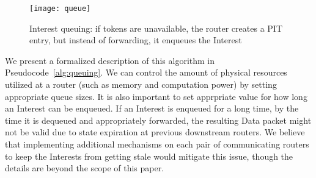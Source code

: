\begin{figure}[htbp]
  \centering
  \texttt{[image: queue]}
  \caption{Interest queuing: if tokens are unavailable, the router creates a PIT entry, but instead of forwarding, it enqueues the Interest}
  \label{fig:queueing}
\end{figure}

We present a formalized description of this algorithm in Pseudocode~\ref{alg:queuing}. We can control the amount of physical resources utilized at a router (such as memory and computation power) by setting appropriate queue sizes. It is also important to set apprpriate value for how long an Interest can be enqueued. If an Interest is enqueued for a long time, by the time it is dequeued and appropriately forwarded, the resulting Data packet might not be valid due to state expiration at previous downstream routers. We believe that implementing additional mechanisms on each pair of communicating routers to keep the Interests from getting stale would mitigate this issue, though the details are beyond the scope of this paper.






